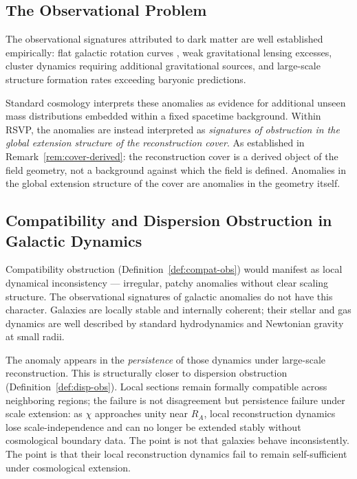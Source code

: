 \documentclass[11pt, a4paper]{article}
\theoremstyle{plain}
\theoremstyle{definition}
\theoremstyle{remark}
\newcommand{\RA}{R_{\!A}}
\begin{document}
\subsection{The Observational Problem}

The observational signatures attributed to dark matter are well established
empirically: flat galactic rotation curves \cite{mcgaugh2011,famaey2012}, weak
gravitational lensing excesses, cluster dynamics requiring additional gravitational
sources, and large-scale structure formation rates exceeding baryonic predictions.

Standard cosmology interprets these anomalies as evidence for additional unseen mass
distributions embedded within a fixed spacetime background. Within RSVP, the
anomalies are instead interpreted as \emph{signatures of obstruction in the global
extension structure of the reconstruction cover}. As established in
Remark~\ref{rem:cover-derived}: the reconstruction cover is a derived object of the
field geometry, not a background against which the field is defined. Anomalies in
the global extension structure of the cover are anomalies in the geometry itself.

\subsection{Compatibility and Dispersion Obstruction in Galactic Dynamics}

Compatibility obstruction (Definition~\ref{def:compat-obs}) would manifest as local
dynamical inconsistency --- irregular, patchy anomalies without clear scaling
structure. The observational signatures of galactic anomalies do not have this
character. Galaxies are locally stable and internally coherent; their stellar and gas
dynamics are well described by standard hydrodynamics and Newtonian gravity at small
radii.

The anomaly appears in the \emph{persistence} of those dynamics under large-scale
reconstruction. This is structurally closer to dispersion obstruction
(Definition~\ref{def:disp-obs}). Local sections remain formally compatible across
neighboring regions; the failure is not disagreement but persistence failure under
scale extension: as $\chi$ approaches unity near $\RA$, local reconstruction dynamics
lose scale-independence and can no longer be extended stably without cosmological
boundary data. The point is not that galaxies behave inconsistently. The point is
that their local reconstruction dynamics fail to remain self-sufficient under
cosmological extension.
\end{document}
